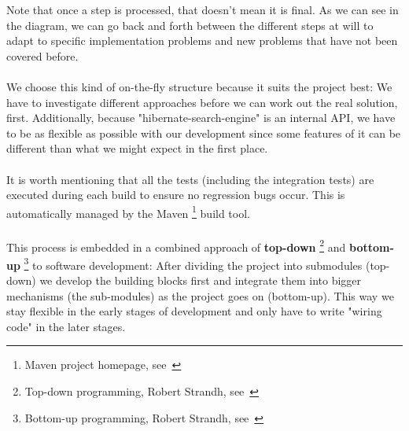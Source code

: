 \noindent
Note that once a step is processed, that doesn't mean it is final. As we can see in the diagram, we can go back and forth between the different steps at will to adapt to specific implementation problems and new problems that have not been covered before.
\\\\
We choose this kind of on-the-fly structure because it suits the project best: We have to investigate different approaches before we can work out the real solution, first. Additionally, because "hibernate-search-engine" is an internal API, we have to be as flexible as possible with our development since some features of it can be different than what we might expect in the first place.
\\\\
It is worth mentioning that all the tests (including the integration tests) are executed during each build to ensure no regression bugs occur. This is automatically managed by the Maven \footnote{Maven project homepage, see~\cite{maven_homepage}} build tool.
\\\\
This process is embedded in a combined approach of \textbf{top-down} \footnote{Top-down programming, Robert Strandh, see~\cite{top_down_strandh}} and \textbf{bottom-up} \footnote{Bottom-up programming, Robert Strandh, see~\cite{bottom_up_strandh}} to software development: After dividing the project into submodules (top-down) we develop the building blocks first and integrate them into bigger mechanisms (the sub-modules) as the project goes on (bottom-up). This way we stay flexible in the early stages of development and only have to write "wiring code" in the later stages.

\pagebreak
